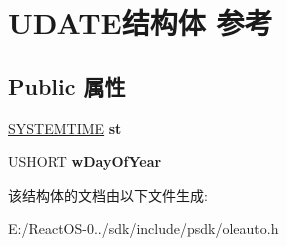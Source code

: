 \hypertarget{struct_u_d_a_t_e}{}\section{U\+D\+A\+T\+E结构体 参考}
\label{struct_u_d_a_t_e}
\subsection*{Public 属性}
\begin{DoxyCompactItemize}
\item 
\mbox{\label{struct_u_d_a_t_e_a1eb804116eb0861578e70bab68f5863b}} 
\hyperlink{struct___s_y_s_t_e_m_t_i_m_e}{S\+Y\+S\+T\+E\+M\+T\+I\+ME} {\bfseries st}
\item 
\mbox{\label{struct_u_d_a_t_e_a27dc8f2c7597baea5fb1a02bc1c29e52}} 
U\+S\+H\+O\+RT {\bfseries w\+Day\+Of\+Year}
\end{DoxyCompactItemize}


该结构体的文档由以下文件生成\+:\begin{DoxyCompactItemize}
\item 
E\+:/\+React\+O\+S-\/0../sdk/include/psdk/oleauto.\+h\end{DoxyCompactItemize}
